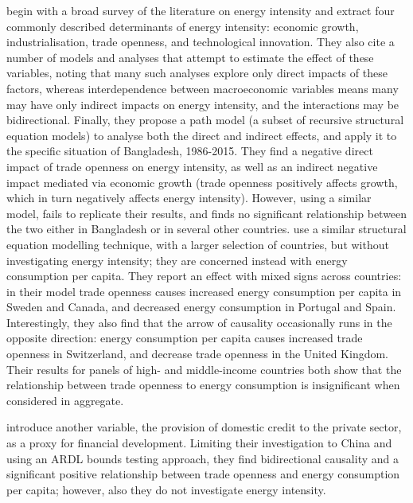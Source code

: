 \documentclass[12pt,a4paper]{article}
\begin{document}
\cite{panHowIndustrializationTrade2019} begin with a broad survey of the literature on energy intensity and extract four commonly described determinants of energy intensity: economic growth, industrialisation, trade openness, and technological innovation.
They also cite a number of models and analyses that attempt to estimate the effect of these variables, noting that many such analyses explore only direct impacts of these factors, whereas interdependence between macroeconomic variables means many may have only indirect impacts on energy intensity, and the interactions may be bidirectional.
Finally, they propose a path model (a subset of recursive structural equation models) to analyse both the direct and indirect effects, and apply it to the specific situation of Bangladesh, 1986-2015.
They find a negative direct impact of trade openness on energy intensity, as well as an indirect negative impact mediated via economic growth (trade openness positively affects growth, which in turn negatively affects energy intensity).
However, using a similar model, \cite{siardPathModelEnergy2020} fails to replicate their results, and finds no significant relationship between the two either in Bangladesh or in several other countries.
\cite{tibaIncomeTradeOpenness2018} use a similar structural equation modelling technique, with a larger selection of countries, but without investigating energy intensity; they are concerned instead with energy consumption per capita. 
They report an effect with mixed signs across countries: in their model trade openness causes increased energy consumption per capita in Sweden and Canada, and decreased energy consumption in Portugal and Spain.
Interestingly, they also find that the arrow of causality occasionally runs in the opposite direction: energy consumption per capita causes increased trade openness in Switzerland, and decrease trade openness in the United Kingdom.
Their results for panels of high- and middle-income countries both show that the relationship between trade openness to energy consumption is insignificant when considered in aggregate. 

\cite{shahbazDynamicLinksEnergy2013} introduce another variable, the provision of domestic credit to the private sector, as a proxy for financial development. Limiting their investigation to China and using an ARDL bounds testing approach, they find bidirectional causality and a significant positive relationship between trade openness and energy consumption per capita; however, also they do not investigate energy intensity.
\end{document}
